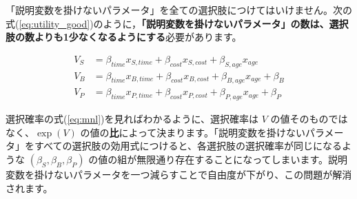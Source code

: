 「説明変数を掛けないパラメータ」を全ての選択肢につけてはいけません。次の式(\ref{eq:utility_good})のように，\textbf{「説明変数を掛けないパラメータ」の数は、選択肢の数よりも1少なくなるようにする}必要があります。

\begin{equation}
    \label{eq:utility_good}
    \begin{aligned}
        V_S & =\beta_{time}x_{S,time}+\beta_{cost} x_{S,cost}+\beta_{S,age}x_{age}         \\
        V_B & =\beta_{time}x_{B,time}+\beta_{cost} x_{B,cost}+\beta_{B,age}x_{age}+\beta_B \\
        V_P & =\beta_{time}x_{P,time}+\beta_{cost} x_{P,cost}+\beta_{P,age}x_{age}+\beta_P
    \end{aligned}
\end{equation}

選択確率の式(\ref{eq:mnl})を見ればわかるように、選択確率は $V$ の値そのものではなく、$\exp(V)$ の値の\textbf{比}によって決まります。「説明変数を掛けないパラメータ」をすべての選択肢の効用式につけると、各選択肢の選択確率が同じになるような $(\beta_S, \beta_B, \beta_P)$ の値の組が無限通り存在することになってしまいます。説明変数を掛けないパラメータを一つ減らすことで自由度が下がり、この問題が解消されます。
